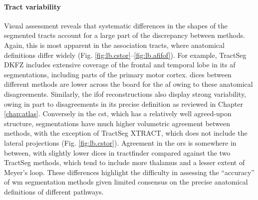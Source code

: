 \paragraph*{Tract variability}

Visual assessment reveals that systematic differences in the shapes of the segmented tracts account for a large part of the discrepancy between methods.
Again, this is most apparent in the association tracts, where anatomical definitions differ widely (Fig. \ref{fig:lb.cstor}--\ref{fig:lb.afifof}).
For example, TractSeg DKFZ includes extensive coverage of the frontal and temporal lobe in its \gls{af} segmentations, including parts of the primary motor cortex.
\Glspl{dice} between different methods are lower across the board for the \gls{af} owing to these anatomical disagreements.
Similarly, the \gls{ifof} reconstructions also display strong variability, owing in part to disagreements in its precise definition as reviewed in Chapter \ref{chap:atlas}.
Conversely in the \gls{cst}, which has a relatively well agreed-upon structure, segmentations have much higher volumetric agreement between methods, with the exception of TractSeg XTRACT, which does not include the lateral projections (Fig. \ref{fig:lb.cstor}).
Agreement in the \glspl{or} is somewhere in between, with slightly lower \glspl{dice} in tractfinder compared against the two TractSeg methods, which tend to include more thalamus and a lesser extent of Meyer's loop.
These differences highlight the difficulty in assessing the ``accuracy'' of \gls{wm} segmentation methods given limited consensus on the precise anatomical definitions of different pathways.

